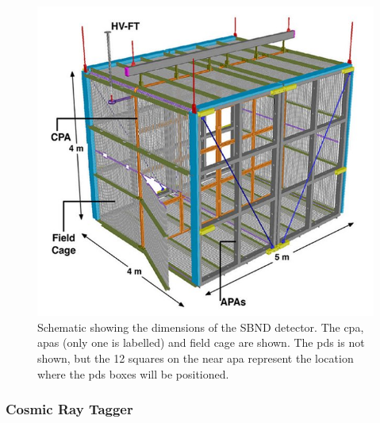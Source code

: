 \begin{figure}[!h]
    \centering
    \includegraphics[width = \largefigwidth]{figures-chap3/SBND.jpg}
    \caption[Schematic of the SBN detector.]{Schematic showing the dimensions of the SBND detector. The \gls{cpa}, \glspl{apa} (only one is labelled) and field cage are shown. The \gls{pds} is not shown, but the 12 squares on the near \gls{apa} represent the location where the \gls{pds} boxes will be positioned. \cite{LArTPC_review}}
    \label{fig:sbnd_schematic}
\end{figure}

\subsubsection*{Cosmic Ray Tagger}

